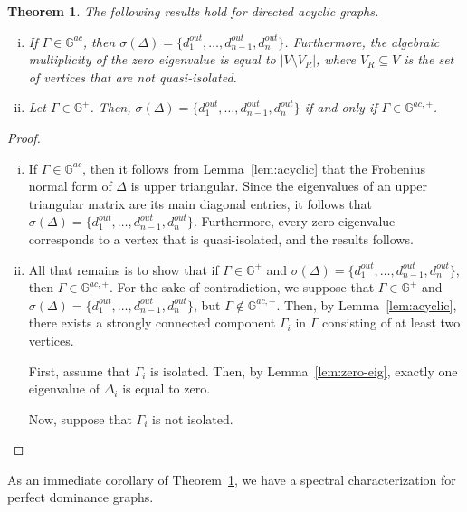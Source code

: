 \documentclass{article}
\newtheorem{theorem}{Theorem}[section]
\newcommand\abs[1]{\left|#1\right|}
\begin{document}
\begin{theorem}\label{thm:acyclic}
The following results hold for directed acyclic graphs.
\begin{enumerate}[i.]
\item	If $\Gamma\in\mathbb{G}^{ac}$, then $\sigma(\Delta) = \{d_{1}^{out},\ldots,d_{n-1}^{out},d_{n}^{out}\}$.
	Furthermore, the algebraic multiplicity of the zero eigenvalue is equal to $\abs{V\setminus{V_{R}}}$, where $V_{R}\subseteq V$ is the set of vertices that are not quasi-isolated.
\item	Let $\Gamma\in\mathbb{G}^{+}$. Then, $\sigma(\Delta) = \{d_{1}^{out},\ldots,d_{n-1}^{out},d_{n}^{out}\}$ if and only if $\Gamma\in\mathbb{G}^{ac,+}$. 
\end{enumerate}
\end{theorem}
\begin{proof}~
\begin{enumerate}[i.]
\item If $\Gamma\in\mathbb{G}^{ac}$, then it follows from Lemma~\ref{lem:acyclic} that the Frobenius normal form of $\Delta$ is upper triangular.
	Since the eigenvalues of an upper triangular matrix are its main diagonal entries, it follows that $\sigma(\Delta)=\{d_{1}^{out},\ldots,d_{n-1}^{out},d_{n}^{out}\}$.
	Furthermore, every zero eigenvalue corresponds to a vertex that is quasi-isolated, and the results follows.
\item	All that remains is to show that if $\Gamma\in\mathbb{G}^{+}$ and $\sigma(\Delta)=\{d_{1}^{out},\ldots,d_{n-1}^{out},d_{n}^{out}\}$, then $\Gamma\in\mathbb{G}^{ac,+}$.
	For the sake of contradiction, we suppose that $\Gamma\in\mathbb{G}^{+}$ and $\sigma(\Delta)=\{d_{1}^{out},\ldots,d_{n-1}^{out},d_{n}^{out}\}$, but $\Gamma\notin\mathbb{G}^{ac,+}$. 
	Then, by Lemma~\ref{lem:acyclic},  there exists a strongly connected component $\Gamma_{i}$ in $\Gamma$ consisting of at least two vertices.
	
	First, assume that $\Gamma_{i}$ is isolated.
	Then, by Lemma~\ref{lem:zero-eig}, exactly one eigenvalue of $\Delta_{i}$ is equal to zero.
	
	Now, suppose that $\Gamma_{i}$ is not isolated. 
\end{enumerate}
\end{proof}

As an immediate corollary of Theorem~\ref{thm:acyclic}, we have a spectral characterization for perfect dominance graphs.
\end{document}
